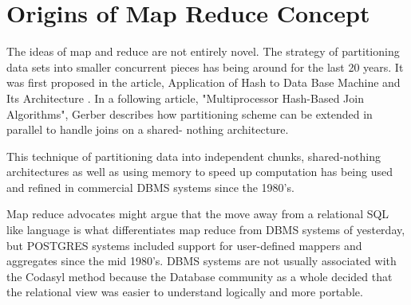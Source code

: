 \documentclass[10pt,twocolumn]{IEEEtran11}
\begin{document}
\section{Origins of Map Reduce Concept}

The ideas of map and reduce are not entirely novel.  The strategy of partitioning  data sets into smaller concurrent pieces has being around for the last 20 years.  It was first proposed in the article, Application of Hash to Data Base Machine and Its Architecture \cite{kitsuregawa1983application}.   In a following article, "Multiprocessor Hash-Based Join Algorithms"\cite{dewitt1985multiprocessor}, Gerber describes how partitioning scheme can be extended in parallel to handle joins on a shared- nothing architecture. 
\par
This technique of partitioning data into independent chunks, shared-nothing architectures as well as using memory to speed up computation has being used and refined in commercial DBMS systems since the 1980's.
\par
Map reduce advocates might argue that the move away from a relational SQL like language is what differentiates map reduce from DBMS systems of yesterday, but POSTGRES systems included support for user-defined  mappers and aggregates  since the mid 1980's.  DBMS systems are not usually associated with the Codasyl method because the Database community as a whole decided that the relational view was easier to understand logically and more portable.  









\end{document}
